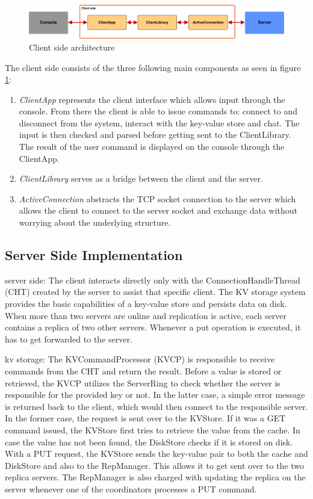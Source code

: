 \begin{figure}[h]
	\centering
	\includegraphics[width=\linewidth]{figures/kvserver/client_arch.png}
	\caption{Client side architecture}
	\label{fig:client_arch}
\end{figure}
The client side consists of the three following main components as seen in figure \ref{fig:client_arch}:
\begin{enumerate} 
  \item \textit{ClientApp} represents the client interface which allows input through the console. From there the client is able to issue commands to: connect to and disconnect from the system, interact with the key-value store and chat. The input is then checked and parsed before getting sent to the ClientLibrary. The result of the user command is displayed on the console through the ClientApp.
  \item \textit{ClientLibrary} serves as a bridge between the client and the server.
  \item \textit{ActiveConnection} abstracts the TCP socket connection to the server which allows the client to connect to the server socket and exchange data without worrying about the underlying structure.
\end{enumerate}
 
\subsection{Server Side Implementation}
\label{sec:implementation_serverside}

server side:
The client interacts directly only with the ConnectionHandleThread (CHT) created by the server to assist that specific client. The KV storage system provides the basic capabilities of a key-value store and persists data on disk. When more than two servers are online and replication is active, each server contains a replica of two other servers. Whenever a put operation is executed, it has to get forwarded to the server.

kv storage:
The KVCommandProcessor (KVCP) is responsible to receive commands from the CHT and return the result. Before a value is stored or retrieved, the KVCP utilizes the ServerRing to check whether the server is responsible for the provided key or not. In the latter case, a simple error message is returned back to the client, which would then connect to the responsible server. In the former case, the request is sent over to the KVStore. If it was a GET command issued, the KVStore first tries to retrieve the value from the cache. In case the value has not been found, the DiskStore checks if it is stored on disk.
With a PUT request, the KVStore sends the key-value pair to both the cache and DiskStore and also to the RepManager. This allows it to get sent over to the two replica servers. The RepManager is also charged with updating the replica on the server whenever one of the coordinators processes a PUT command.

